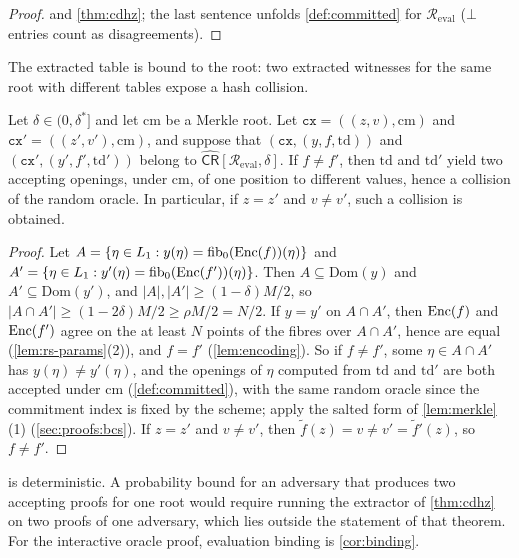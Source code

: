 \begin{proof}
 and \cref{thm:cdhz}; the last sentence unfolds \cref{def:committed} for $\mathcal{R}_{\mathrm{eval}}$ ($\bot$ entries count as disagreements).
\end{proof}

The extracted table is bound to the root: two extracted witnesses for the same root with different tables expose a hash collision.

\begin{lemma}\label{lem:cr-unique}
Let $\delta \in (0,\delta^*]$ and let $\mathrm{cm}$ be a Merkle root. Let $\mathtt{cx} = ((z,v), \mathrm{cm})$ and $\mathtt{cx}' = ((z',v'), \mathrm{cm})$, and suppose that $(\mathtt{cx}, (y, f, \mathrm{td}))$ and $(\mathtt{cx}', (y', f', \mathrm{td}'))$ belong to $\widehat{\mathsf{CR}}[\mathcal{R}_{\mathrm{eval}}, \delta]$.
If $f \ne f'$, then $\mathrm{td}$ and $\mathrm{td}'$ yield two accepting openings, under $\mathrm{cm}$, of one position to different values, hence a collision of the random oracle.
In particular, if $z = z'$ and $v \ne v'$, such a collision is obtained.
\end{lemma}

\begin{proof}
Let $A = \{\eta \in L_1 : y(\eta) = \mathrm{fib}_0(\mathrm{Enc}(f))(\eta)\}$ and $A' = \{\eta \in L_1 : y'(\eta) = \mathrm{fib}_0(\mathrm{Enc}(f'))(\eta)\}$.
Then $A \subseteq \mathrm{Dom}(y)$ and $A' \subseteq \mathrm{Dom}(y')$, and $|A|, |A'| \ge (1-\delta)M/2$, so $|A \cap A'| \ge (1-2\delta)M/2 \ge \rho M/2 = N/2$.
If $y = y'$ on $A \cap A'$, then $\mathrm{Enc}(f)$ and $\mathrm{Enc}(f')$ agree on the at least $N$ points of the fibres over $A \cap A'$, hence are equal (\cref{lem:rs-params}(2)), and $f = f'$ (\cref{lem:encoding}).
So if $f \ne f'$, some $\eta \in A \cap A'$ has $y(\eta) \ne y'(\eta)$, and the openings of $\eta$ computed from $\mathrm{td}$ and $\mathrm{td}'$ are both accepted under $\mathrm{cm}$ (\cref{def:committed}), with the same random oracle since the commitment index is fixed by the scheme; apply the salted form of \cref{lem:merkle}(1) (\cref{sec:proofs:bcs}).
If $z = z'$ and $v \ne v'$, then $\tilde f(z) = v \ne v' = \tilde f'(z)$, so $f \ne f'$.
\end{proof}

 is deterministic. A probability bound for an adversary that produces two accepting proofs for one root would require running the extractor of \cref{thm:cdhz} on two proofs of one adversary, which lies outside the statement of that theorem. For the interactive oracle proof, evaluation binding is \cref{cor:binding}.

